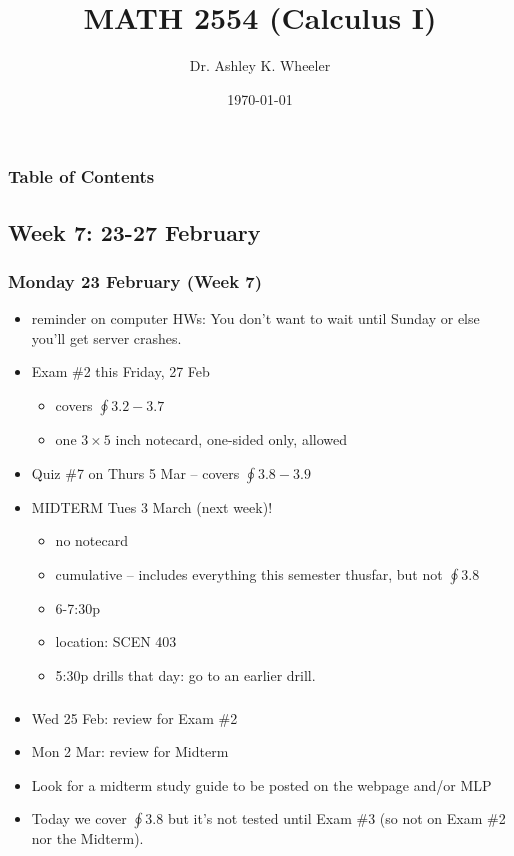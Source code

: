 \documentclass[14pt]{beamer}
\title[Cal I S2015]{MATH 2554 (Calculus I)}
\subtitle{}
\author[Wheeler]{Dr. Ashley K. Wheeler}
\institute{University of Arkansas}
\date{\today}
\begin{document}
\maketitle

\begin{frame}
\frametitle{Table of Contents}
\tableofcontents
\end{frame}


\begin{frame}
\section[Week 7]{Week 7: 23-27 February}
\frametitle{Monday 23 February (Week 7)}
\footnotesize
\begin{itemize}
\item reminder on computer HWs: You don't want to wait until Sunday or else you'll get server crashes.
\item Exam \#2 this Friday, 27 Feb
	\begin{itemize}
	\footnotesize
	\item covers $\oint 3.2-3.7$
	\item one $3\times 5$ inch notecard, one-sided only, allowed
	\end{itemize}
\item Quiz \#7 on Thurs 5 Mar -- covers $\oint 3.8-3.9$
\item MIDTERM Tues 3 March (next week)!
	\begin{itemize}
	\footnotesize
	\item no notecard
	\item cumulative -- includes everything this semester thusfar, but not $\oint 3.8$
	\item 6-7:30p
	\item location: SCEN 403
	\item 5:30p drills that day: go to an earlier drill.
	\end{itemize}
\end{itemize}
\end{frame}

\begin{frame}
\frametitle{}
\small
\begin{itemize}
\item Wed 25 Feb: review for Exam \#2
\item Mon 2 Mar: review for Midterm
\item Look for a midterm study guide to be posted on the webpage and/or MLP
\item Today we cover $\oint 3.8$ but it's not tested until Exam \#3 (so not on Exam \#2 nor the Midterm). 
\end{itemize}
\end{frame}
\end{document}

